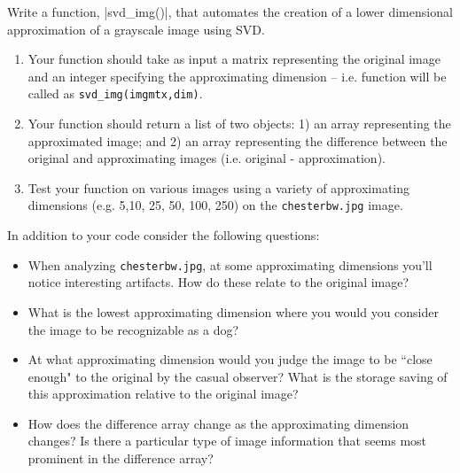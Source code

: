 \begin{assignment}
\small
Write a function, |svd_img()|, that automates the creation of a lower dimensional approximation of a grayscale image using SVD.
%
\begin{enumerate}
  \item Your function should take as input a matrix representing the original image and an integer specifying the approximating dimension -- i.e. function will be called as \verb|svd_img(imgmtx,dim)|.

  \item Your function should return a list of two objects: 1) an array representing the approximated image; and 2) an array representing the difference between the original and approximating images (i.e. original - approximation).

  \item Test your function on various images using a variety of approximating dimensions (e.g. 5,10, 25, 50, 100, 250) on the \verb|chesterbw.jpg| image.
\end{enumerate}


In addition to your code consider the following questions:
%
\begin{itemize}
\item When analyzing \texttt{chesterbw.jpg}, at some approximating dimensions you'll notice interesting artifacts. How do these relate to the original image?

\item What is the lowest approximating dimension where you would you consider the image to be recognizable as a dog?

\item At what approximating dimension would you judge the  image to be ``close enough"  to the original by the casual observer? What is the storage saving of this approximation relative to the original image?

\item How does the difference array change as the approximating dimension changes? Is there a particular type of image information that seems most prominent in the difference array?
\end{itemize}


\end{assignment}




